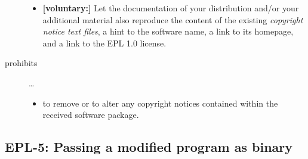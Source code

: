 \begin{description}
\begin{itemize}
  \item \textbf{[voluntary:]} Let the documentation of your distribution and/or
  your additional material also reproduce the content of the existing
  \emph{copyright notice text files}, a hint to the software name, a link to its
  homepage, and a link to the EPL 1.0 license.
  
 \end{itemize}
 
\item[prohibits] \ldots
\begin{itemize}
  \item to remove or to alter any copyright notices contained within the
  received software package.
\end{itemize}

\end{description}

\subsection{EPL-5: Passing a modified program as binary}
\label{OSUC-04B-EPL}

